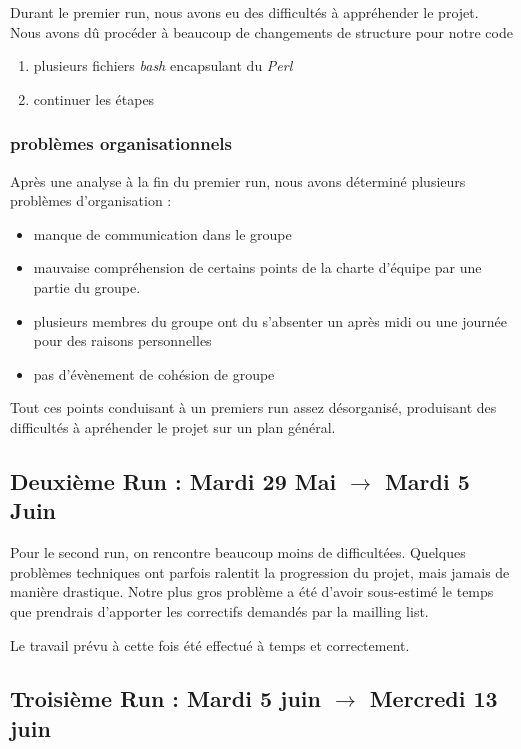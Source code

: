 \documentclass[11pt]{article}
\begin{document}
Durant le premier run, nous avons eu des difficultés à appréhender le projet. Nous avons dû procéder à beaucoup de changements de structure pour notre code
\begin{enumerate}
\item plusieurs fichiers \textit{bash} encapsulant du \textit{Perl}
\item continuer les étapes
\end{enumerate}

\subsubsection{problèmes organisationnels}

Après une analyse à la fin du premier run, nous avons déterminé plusieurs problèmes d'organisation : 

\begin{itemize}
\item manque de communication dans le groupe
\item mauvaise compréhension de certains points de la charte d'équipe par une partie du groupe.
\item plusieurs membres du groupe ont du s'absenter un après midi ou une journée pour des raisons personnelles
\item pas d'évènement de cohésion de groupe
\end{itemize}

Tout ces points conduisant à un premiers run assez désorganisé, produisant des difficultés à apréhender le projet sur un plan général.

\subsection{Deuxième Run : Mardi 29 Mai $\rightarrow$ Mardi 5 Juin}

Pour le second run, on rencontre beaucoup moins de difficultées. Quelques problèmes techniques ont parfois ralentit la progression du projet, mais jamais de manière drastique. Notre plus gros problème a été d'avoir sous-estimé le temps que prendrais d'apporter les correctifs demandés par la mailling list. 

Le travail prévu à cette fois été effectué à temps et correctement.

\subsection{Troisième Run : Mardi 5 juin $\rightarrow$ Mercredi 13 juin}
\end{document}
